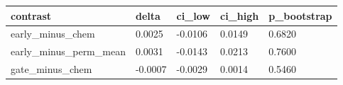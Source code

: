\begin{tabular}{lllll}
\hline
contrast & delta & ci\_low & ci\_high & p\_bootstrap \\
\hline
early\_minus\_chem & 0.0025 & -0.0106 & 0.0149 & 0.6820 \\
early\_minus\_perm\_mean & 0.0031 & -0.0143 & 0.0213 & 0.7600 \\
gate\_minus\_chem & -0.0007 & -0.0029 & 0.0014 & 0.5460 \\
\hline
\end{tabular}

